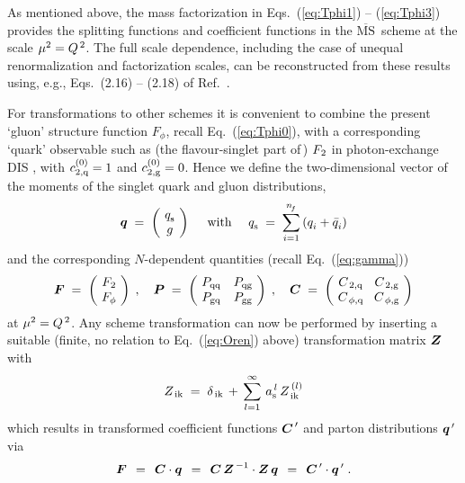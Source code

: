 \documentclass[12pt]{article}
\newcommand{\beq}{\begin{equation}}
\newcommand{\eeq}{\end{equation}}
\newcommand{\MSb}{$\overline{\mbox{MS}}$}
\newcommand{\ar}{a_{\rm s}}
\newcommand{\qV}{\mbox{\boldmath $q$}}
\newcommand{\FV}{\mbox{\boldmath $F$}}
\newcommand{\CV}{\mbox{\boldmath $C$}}
\newcommand{\PV}{\mbox{\boldmath $P$}}
\newcommand{\ZV}{\mbox{\boldmath $Z$}}
\begin{document}
As mentioned above, the mass factorization in Eqs.~(\ref{eq:Tphi1}) -- 
(\ref{eq:Tphi3}) provides the splitting functions and coefficient functions
in the \MSb\ scheme at the scale $\mu^2 = {Q^{\, 2}}$. The full scale dependence,
including the case of unequal renormalization and factorization scales, can be
reconstructed from these results using, e.g., Eqs.~(2.16) -- (2.18) of Ref.\
\cite{NV2}.

For transformations to other schemes it is convenient to combine the present
`gluon' structure function $F_\phi$, recall Eq.~(\ref{eq:Tphi0}), with a 
corresponding `quark' observable such as (the flavour-singlet part of$\,$) 
${F_{\:\! 2}}$ in photon-exchange DIS \cite{MVV6}, with $c_{2,\rm q}^{(0)} = 1$ and 
$c_{2,\rm g}^{(0)} = 0$. Hence we define the two-dimensional vector of the
moments of the singlet quark and gluon distributions,
%
\beq
\label{eq:QSvec}
  \qV \;=\; \left( \begin{array}{c} \!q_{\rm s}^{}\! \\ g  \end{array} \right)
  \quad \mbox{ with } \quad
  q_{\rm s}^{} \; = \; \sum_{i=1}^{\nf} \left( q_i^{} + \bar{q}_i^{} \right) 
\eeq
%
and the corresponding $N$-dependent quantities (recall Eq.~(\ref{eq:gamma})) 
%
\beq
\label{eq:FPCmat}
  \FV \;=\; \left( \begin{array}{c} \!\Ftwo\! \\ \!F_\phi\! \end{array} \right) 
  \; , \quad
  \PV \;=\; \left( \begin{array}{cc} 
            \!  P_{\rm qq} & P_{\rm qg} \! \\
            \!  P_{\rm gq} & P_{\rm gg} \! \end{array} \right)
  \; , \quad
  \CV \;=\; \left( \begin{array}{cc}
            \!  C_{\,\rm 2,q} \! & C_{\,\rm 2,g} \! \\
            \!  C_{\,\rm \phi,q} \! & C_{\,\rm \phi,g} \! \end{array} \right)
\eeq
%
at $\mu^2 = {Q^{\, 2}}$.
Any scheme transformation can now be performed by inserting a suitable (finite,
no relation to Eq.~(\ref{eq:Oren}) above) transformation matrix $\ZV$ with 
%
\beq
\label{eq:Zmat}
  Z_{\,\rm ik} \;=\; \delta_{\,\rm ik} \, + \,
  \sum_{l=1}^{\infty} \, \ar^{\, l} \, Z_{\,\rm ik}^{\,(l)}
\eeq 
%
which results in transformed coefficient functions $\CV^{\,\prime}$ and parton
distributions $\qV^{\,\prime}$ via
%
\beq
\label{eq:Cqnew}
  \FV \:\:=\:\: \CV \cdot \qV 
      \:\:=\:\: \CV\, \ZV^{\,-1} \cdot \ZV\, \qV
      \:\:=\:\: \CV^{\,\prime} \cdot \qV^{\,\prime}
  \; .
\eeq
 
\end{document}
